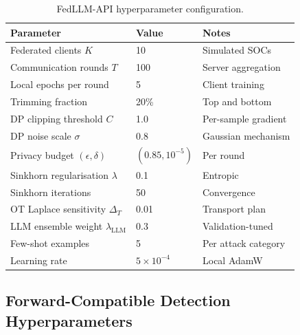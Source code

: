 \begin{table}[htbp]
\centering
\caption{FedLLM-API hyperparameter configuration.}
\label{tab:hp_fedllm}
\begin{tabular}{lll}
\toprule
Parameter & Value & Notes \\
\midrule
Federated clients $K$     & 10    & Simulated SOCs \\
Communication rounds $T$  & 100   & Server aggregation \\
Local epochs per round     & 5     & Client training \\
Trimming fraction          & 20\%  & Top and bottom \\
DP clipping threshold $C$  & 1.0   & Per-sample gradient \\
DP noise scale $\sigma$    & 0.8   & Gaussian mechanism \\
Privacy budget $(\epsilon,\delta)$ & $(0.85,10^{-5})$ & Per round \\
Sinkhorn regularisation $\lambda$ & 0.1 & Entropic \\
Sinkhorn iterations        & 50    & Convergence \\
OT Laplace sensitivity $\Delta_T$ & 0.01 & Transport plan \\
LLM ensemble weight $\lambda_{\mathrm{LLM}}$ & 0.3 & Validation-tuned \\
Few-shot examples          & 5     & Per attack category \\
Learning rate              & $5\times10^{-4}$ & Local AdamW \\
\bottomrule
\end{tabular}
\end{table}


\subsection{Forward-Compatible Detection Hyperparameters}
\label{app:hp_pqidps}

